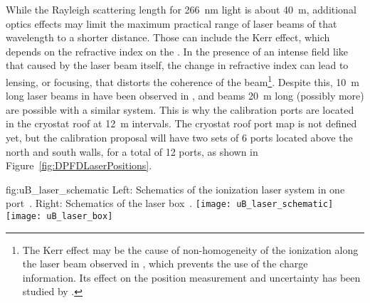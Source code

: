 While the Rayleigh scattering length for \SI{266}{\nano\m}  light is about \SI{40}{\m}, additional optics effects may limit the maximum practical range of laser beams of that wavelength to a shorter distance. Those can include the Kerr effect, which depends on the refractive index on the \efield. In the presence of an intense field like that caused by the laser beam itself, the change in refractive index can lead to lensing, or focusing, that distorts the coherence of the beam\footnote{The Kerr effect may be the cause of non-homogeneity of the ionization along the laser beam observed in , which prevents the use of the charge information. Its effect on the position measurement and \efield uncertainty has been studied by .}. 
Despite this, \SI{10}{\m} long laser beams in  have been observed in , and beams \SI{20}{\m} long (possibly more) are possible with a similar system.
This is why the calibration ports are located in the cryostat roof at \SI{12}{\m} intervals. The   cryostat roof port map is not defined yet, but the calibration proposal will have two sets of \num{6} ports located above the north and south walls, for a total of \num{12} ports, as shown in Figure~\ref{fig:DPFDLaserPositions}.




\begin{dunefigure}{fig:uB_laser_schematic}
{Left: Schematics of the ionization laser system in one port~\cite{Antonello:2015lea}. Right: Schematics of the laser box~\cite{microboone}.}
\texttt{[image: uB\_laser\_schematic]}
\texttt{[image: uB\_laser\_box]}
\end{dunefigure}



